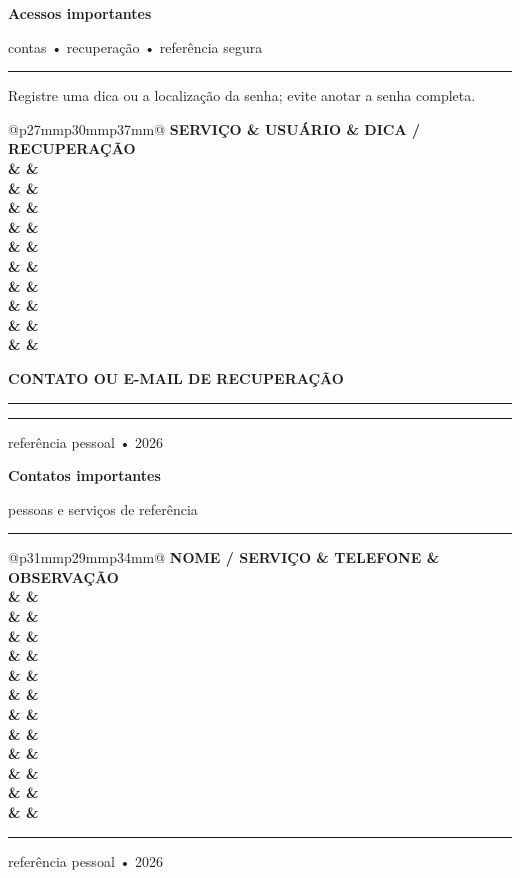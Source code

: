 \documentclass[10pt,a5paper,twoside]{article}
\newcommand{\tituloplanejamento}[2]{%
  {\color{TechNavy}\fontsize{23}{25}\selectfont\bfseries #1}\par
  \vspace{1mm}
  {\color{TechMuted}\ttfamily\small #2}\par
  \vspace{3mm}
  {\color{TechAccent}\rule{16mm}{1pt}}\par
  \vspace{6mm}
}
\newcommand{\linhaplanejamento}[1]{%
  {\color{TechMuted}\scriptsize\bfseries #1}\par
  \vspace{1.2mm}\rule{\linewidth}{.35pt}\par\vspace{4mm}
}
\newcommand{\paginaplanejamento}[3]{%
  \thispagestyle{empty}
  \vspace*{5mm}
  \tituloplanejamento{#1}{#2}
  #3
  \vfill
  {\color{TechLight}\rule{\linewidth}{.4pt}}\par
  \vspace{1mm}
  {\color{TechMuted}\ttfamily\scriptsize referência pessoal • 2026}
  \clearpage
}
\begin{document}
\paginaplanejamento{Acessos importantes}{contas • recuperação • referência segura}{%
  {\color{TechMuted}\scriptsize Registre uma dica ou a localização da senha; evite anotar a senha completa.}\par
  \vspace{5mm}
  {\scriptsize
  \begin{tabular}{@{}p{27mm}p{30mm}p{37mm}@{}}
    \color{TechMuted}\bfseries SERVIÇO & \color{TechMuted}\bfseries USUÁRIO &
    \color{TechMuted}\bfseries DICA / RECUPERAÇÃO \\
    \hline
    & & \\[7mm]\hline
    & & \\[7mm]\hline
    & & \\[7mm]\hline
    & & \\[7mm]\hline
    & & \\[7mm]\hline
    & & \\[7mm]\hline
    & & \\[7mm]\hline
    & & \\[7mm]\hline
    & & \\[7mm]\hline
    & & \\[7mm]\hline
  \end{tabular}}\par
  \vspace{6mm}
  \linhaplanejamento{CONTATO OU E-MAIL DE RECUPERAÇÃO}
}

\paginaplanejamento{Contatos importantes}{pessoas e serviços de referência}{%
  {\scriptsize
  \begin{tabular}{@{}p{31mm}p{29mm}p{34mm}@{}}
    \color{TechMuted}\bfseries NOME / SERVIÇO & \color{TechMuted}\bfseries TELEFONE &
    \color{TechMuted}\bfseries OBSERVAÇÃO \\
    \hline
    & & \\[6.5mm]\hline
    & & \\[6.5mm]\hline
    & & \\[6.5mm]\hline
    & & \\[6.5mm]\hline
    & & \\[6.5mm]\hline
    & & \\[6.5mm]\hline
    & & \\[6.5mm]\hline
    & & \\[6.5mm]\hline
    & & \\[6.5mm]\hline
    & & \\[6.5mm]\hline
    & & \\[6.5mm]\hline
    & & \\[6.5mm]\hline
  \end{tabular}}\par
}
\end{document}
